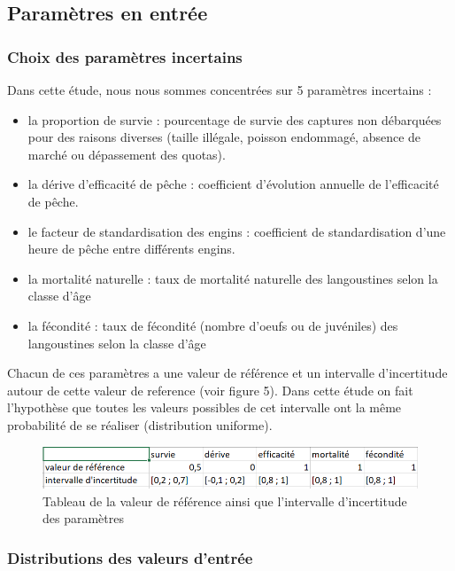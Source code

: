 \documentclass[
]{article}
\begin{document}
\hypertarget{paramuxe8tres-en-entruxe9e}{%
\subsection{Paramètres en entrée}\label{paramuxe8tres-en-entruxe9e}}

\hypertarget{choix-des-paramuxe8tres-incertains}{%
\subsubsection{Choix des paramètres
incertains}\label{choix-des-paramuxe8tres-incertains}}

Dans cette étude, nous nous sommes concentrées sur 5 paramètres
incertains :

\begin{itemize}
\item
  la proportion de survie : pourcentage de survie des captures non
  débarquées pour des raisons diverses (taille illégale, poisson
  endommagé, absence de marché ou dépassement des quotas).
\item
  la dérive d'efficacité de pêche : coefficient d'évolution annuelle de
  l'efficacité de pêche.
\item
  le facteur de standardisation des engins : coefficient de
  standardisation d'une heure de pêche entre différents engins.
\item
  la mortalité naturelle : taux de mortalité naturelle des langoustines
  selon la classe d'âge
\item
  la fécondité : taux de fécondité (nombre d'oeufs ou de juvéniles) des
  langoustines selon la classe d'âge
\end{itemize}

Chacun de ces paramètres a une valeur de référence et un intervalle
d'incertitude autour de cette valeur de reference (voir figure 5). Dans
cette étude on fait l'hypothèse que toutes les valeurs possibles de cet
intervalle ont la même probabilité de se réaliser (distribution
uniforme).

\begin{figure}
\centering
\includegraphics{tabParam.png}
\caption{Tableau de la valeur de référence ainsi que l'intervalle
d'incertitude des paramètres}
\end{figure}

\hypertarget{distributions-des-valeurs-dentruxe9e}{%
\subsubsection{Distributions des valeurs
d'entrée}\label{distributions-des-valeurs-dentruxe9e}}
\end{document}
